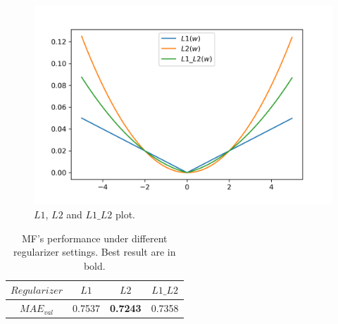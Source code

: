 \documentclass[journal, a4paper]{IEEEtran}
\begin{document}
\begin{figure}[!hbt]
	\begin{center}
		\includegraphics[width=\columnwidth]{regs}
		\caption{$L1$, $L2$ and $L1\_L2$ plot.}
		\label{fig:regs}
	\end{center}
\end{figure} \par

\begin{table}[!hbt]
	\begin{center}
		\caption{MF's performance under different regularizer settings. Best result are in bold.}
		\label{tab:reg_mae}
		\begin{tabular}{|c|c|c|c|}
			\hline
			$Regularizer$  & $L1$ & $L2$ & $L1\_L2$  \\
			\hline
			$MAE_{val}$ & 0.7537 & \textbf{0.7243} & 0.7358 \\
			\hline
		\end{tabular}
	\end{center}
\end{table} \par
\end{document}
